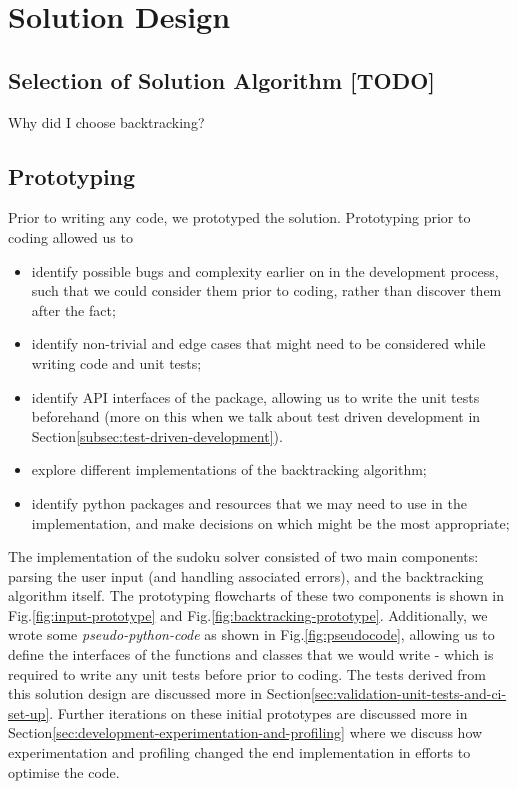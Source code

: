 
\section{Solution Design}\label{sec:solution-design}
    \subsection{Selection of Solution Algorithm [TODO]}\label{subsec:solution-algorithm}
    Why did I choose backtracking?

    \subsection{Prototyping}\label{subsec:prototyping}
    Prior to writing any code, we prototyped the solution.
    Prototyping prior to coding allowed us to
    \begin{itemize}
        \item identify possible bugs and complexity earlier on in the development process, such that we could consider them
        prior to coding, rather than discover them after the fact;
        \item identify non-trivial and edge cases that might need to be considered while writing code and unit tests;
        \item identify API interfaces of the package, allowing us to write the unit tests beforehand (more on this when
        we talk about test driven development in Section\eqref{subsec:test-driven-development}).
        \item explore different implementations of the backtracking algorithm;
        \item identify python packages and resources that we may need to use in the implementation, and make decisions on which
        might be the most appropriate;
    \end{itemize}
    The implementation of the sudoku solver consisted of two main components: parsing the user input (and handling
    associated errors), and the backtracking algorithm itself.
    The prototyping flowcharts of these two components is shown in Fig.\eqref{fig:input-prototype} and Fig.\eqref{fig:backtracking-prototype}.
    Additionally, we wrote some \textit{pseudo-python-code} as shown in Fig.\eqref{fig:pseudocode}, allowing us to define
    the interfaces of the functions and classes that we would write - which is required to write any unit tests before prior
    to coding.
    The tests derived from this solution design are discussed more in Section\eqref{sec:validation-unit-tests-and-ci-set-up}.
    Further iterations on these initial prototypes are discussed more in Section\eqref{sec:development-experimentation-and-profiling}
    where we discuss how experimentation and profiling changed the end implementation in efforts to optimise the code.

